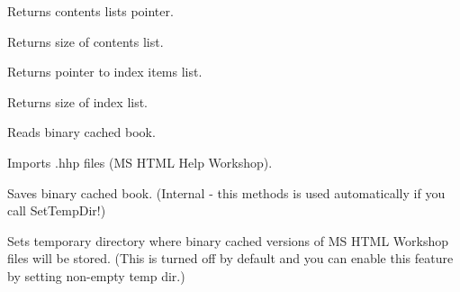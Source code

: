 
Returns contents lists pointer.

\label{wxhtmlhelpdatagetcontentscnt}


Returns size of contents list.

\label{wxhtmlhelpdatagetindex}


Returns pointer to index items list.

\label{wxhtmlhelpdatagetindexcnt}


Returns size of index list.

\label{wxhtmlhelpdataloadcachedbook}


Reads binary cached book.


\label{wxhtmlhelpdataloadmsproject}


Imports .hhp files (MS HTML Help Workshop).

\label{wxhtmlhelpdatasavecachedbook}


Saves binary cached book. (Internal - this methods is used automatically
if you call SetTempDir!)

\label{wxhtmlhelpdatasettempdir}


Sets temporary directory where binary cached versions of MS HTML Workshop
files will be stored. (This is turned off by default and you can enable
this feature by setting non-empty temp dir.)

